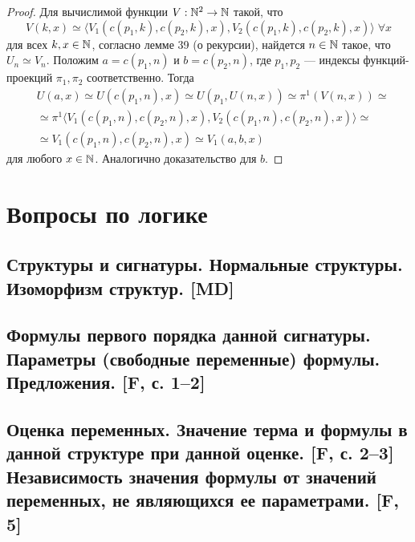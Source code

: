 \documentclass[a4paper, fleqn]{article}
\begin{document}
        \begin{proof}
            Для вычислимой функции $V : \mathbb{N}^2 \to \mathbb{N}$ такой, что\\[-10 pt]
\[ V(k, x) \simeq \langle  V_1(c(p_1, k), c(p_2, k), x), V_2(c(p_1, k), c(p_2, k), x) \rangle \; \forall x \]
для всех $k, x \in \mathbb{N}$, согласно лемме 39 (о рекурсии), найдется $n \in \mathbb{N}$ такое, что $U_n \simeq V_n$. Положим $a = c(p_1, n)$ и $b = c(p_2, n)$, где $p_1, p_2$ --- индексы функций-проекций $\pi_1, \pi_2$ соответственно. Тогда
            \begin{align*}
                & U(a, x) \simeq U(c(p_1, n), x) \simeq U(p_1, U(n, x)) \simeq \pi^1(V(n, x)) \simeq \\
                & \simeq \pi^1 \langle V_1(c(p_1, n), c(p_2, n), x), V_2(c(p_1, n), c(p_2, n), x) \rangle \simeq \\
                & \simeq V_1(c(p_1, n), c(p_2, n), x) \simeq V_1(a, b, x)
            \end{align*}
            для любого $x \in \mathbb{N}$. Аналогично доказательство для $b$.
        \end{proof}


\section{Вопросы по логике}

    \subsection{Структуры и сигнатуры. Нормальные структуры. Изоморфизм структур. [MD]}

    \subsection{Формулы первого порядка данной сигнатуры. Параметры (свободные переменные) формулы. Предложения. [F, с. 1–2]}

    \subsection{Оценка переменных. Значение терма и формулы в данной структуре при данной оценке. [F, с. 2–3] Независимость значения формулы от значений переменных, не являющихся ее параметрами. [F, 5]}

\end{document}
